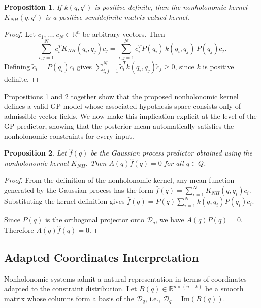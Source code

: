 \documentclass[letterpaper, 10 pt, conference]{ieeeconf}
\newtheorem{proposition}{Proposition}
\begin{document}
\begin{proposition}
If $k(q,q')$ is positive definite, then the nonholonomic kernel $K_{NH}(q,q')$ is a positive semidefinite matrix-valued kernel.
\end{proposition}

\begin{proof}
Let $c_1,\ldots,c_N\in\mathbb R^n$ be arbitrary vectors. Then
\begin{equation*}
\sum_{i,j=1}^N c_i^T K_{NH}(q_i,q_j)c_j
=
\sum_{i,j=1}^N c_i^T P(q_i)\, k(q_i,q_j)\, P(q_j)c_j .
\end{equation*}
Defining $\tilde c_i = P(q_i)c_i$ gives
$\displaystyle{\sum_{i,j=1}^N \tilde c_i^T k(q_i,q_j)\tilde c_j \ge 0}$, since $k$ is positive definite.
\end{proof}



Propositions 1 and 2 together show that the proposed nonholonomic kernel defines a valid GP model whose associated hypothesis space consists only of admissible vector fields. We now make this implication explicit at the level of the GP predictor, showing that the posterior mean automatically satisfies the nonholonomic constraints for every input.


\begin{proposition}
Let $\hat f(q)$ be the Gaussian process predictor obtained using the nonholonomic kernel $K_{NH}$. Then $A(q)\hat f(q)=0$ for all $q\in Q$.
\end{proposition}

\begin{proof}
From the definition of the nonholonomic kernel, any mean function generated by the Gaussian process has the form $\displaystyle{\hat f(q)=\sum_{i=1}^N K_{NH}(q,q_i)c_i}$. Substituting the kernel definition gives
$\displaystyle{\hat f(q)=P(q)\sum_{i=1}^N k(q,q_i)P(q_i)c_i}$.

Since $P(q)$ is the orthogonal projector onto $\mathcal D_q$, we have $A(q)P(q)=0$. Therefore $A(q)\hat f(q)=0$. \end{proof}

\subsection{Adapted Coordinates Interpretation} 

Nonholonomic systems admit a natural representation in terms of coordinates adapted to the constraint distribution. Let $B(q)\in\mathbb R^{n\times (n-k)}$ be a smooth matrix whose columns form a basis of the $\mathcal D_q$, i.e., $\mathcal D_q = \mathrm{Im}(B(q))$.
\end{document}
